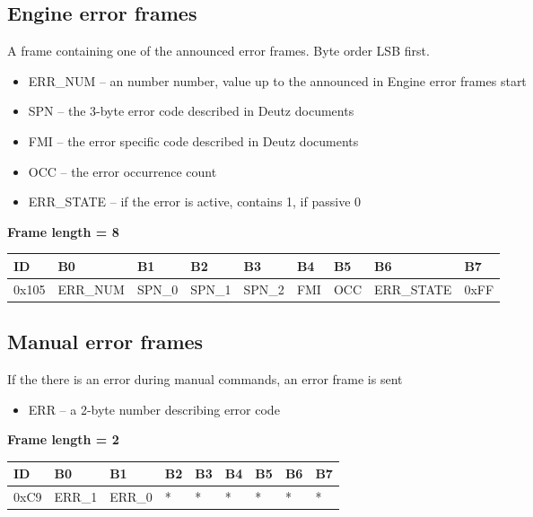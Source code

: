 \documentclass{article}
\begin{document}
\subsection{Engine error frames}
A frame containing one of the announced error frames. Byte order LSB first.
\begin{itemize}
    \item ERR\_NUM -- an number number, value up to the announced in Engine error frames start
    \item SPN -- the 3-byte error code described in Deutz documents
    \item FMI -- the error specific code described in Deutz documents
    \item OCC -- the error occurrence count
    \item ERR\_STATE -- if the error is active, contains 1, if passive 0
\end{itemize}{}

\textbf{Frame length = 8}
\begin{center}
    \begin{tabular}{| p{20pt} | p{45pt} | p{60pt} | p{40pt} | p{40pt} | p{40pt} | p{40pt} | p{55pt} | p{40pt} |}
        \hline
        ID    & B0       & B1     & B2     & B3     & B4  & B5  & B6         & B7   \\
        \hline
        0x105 & ERR\_NUM & SPN\_0 & SPN\_1 & SPN\_2 & FMI & OCC & ERR\_STATE & 0xFF \\
        \hline
    \end{tabular}
\end{center}

\subsection{Manual error frames}
If the there is an error during manual commands, an error frame is sent
\begin{itemize}
    \item ERR -- a 2-byte number describing error code
\end{itemize}{}

\textbf{Frame length = 2}
\begin{center}
    \begin{tabular}{| p{20pt} | p{40pt} | p{40pt} | p{40pt} | p{40pt} | p{40pt} | p{40pt} | p{40pt} | p{40pt} |}
        \hline
        ID   & B0     & B1     & B2 & B3 & B4 & B5 & B6 & B7 \\
        \hline
        0xC9 & ERR\_1 & ERR\_0 & *  & *  & *  & *  & *  & *  \\
        \hline
    \end{tabular}
\end{center}
\end{document}

